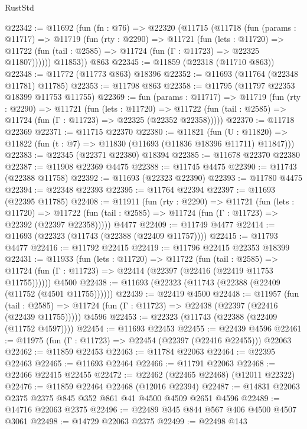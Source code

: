 \begin{lexlean}{RustStd}
\begin{coremodule}
@22342 := @11692
    (fun (fn : @76) =>
    @22320
      (@11715
        (@11718
          (fun (params : @11717) =>
          @11719
            (fun (rty : @2290) =>
            @11721
              (fun (lets : @11720) =>
              @11722 (fun (tail : @2585) => @11724 (fun (Γ : @11723) => @22325 @11807))))))
        @11853))
    @863
@22345 := @11859 (@22318 (@11710 @863))
@22348 := @11772 (@11773 @863) @18396
@22352 := @11693 (@11764 (@22348 @11781) @11785)
@22353 := @11798 @863
@22358 := @11795 (@11797 @22353 @18399 @11753 @11755)
@22369 := fun (params : @11717) =>
  @11719
    (fun (rty : @2290) =>
    @11721
      (fun (lets : @11720) =>
      @11722 (fun (tail : @2585) => @11724 (fun (Γ : @11723) => @22325 (@22352 @22358)))))
@22370 := @11718 @22369
@22371 := @11715 @22370
@22380 := @11821
    (fun (U : @11820) => @11822 (fun (t : @7) => @11830 (@11693 (@11836 @18396 @11711) @11847)))
@22383 := @22345 (@22371 @22380) @18394
@22385 := @11678 @22370 @22380
@22387 := @11908 @22369 @4475
@22388 := @11745 @4475
@22390 := @11743 (@22388 @11758)
@22392 := @11693 (@22323 @22390)
@22393 := @11780 @4475
@22394 := @22348 @22393
@22395 := @11764 @22394
@22397 := @11693 (@22395 @11785)
@22408 := @11911
    (fun (rty : @2290) =>
    @11721
      (fun (lets : @11720) =>
      @11722 (fun (tail : @2585) => @11724 (fun (Γ : @11723) => @22392 (@22397 @22358)))))
    @4477
@22409 := @11749 @4477
@22414 := @11693 (@22323 (@11743 (@22388 (@22409 @11757))))
@22415 := @11793 @4477
@22416 := @11792 @22415
@22419 := @11796 @22415 @22353 @18399
@22431 := @11933
    (fun (lets : @11720) =>
    @11722
      (fun (tail : @2585) =>
      @11724 (fun (Γ : @11723) => @22414 (@22397 (@22416 (@22419 @11753 @11755))))))
    @4500
@22438 := @11693 (@22323 (@11743 (@22388 (@22409 (@11752 (@4501 @11755))))))
@22439 := @22419 @4500
@22448 := @11957
    (fun (tail : @2585) => @11724 (fun (Γ : @11723) => @22438 (@22397 (@22416 (@22439 @11755)))))
    @4596
@22453 := @22323 (@11743 (@22388 (@22409 (@11752 @4597))))
@22454 := @11693 @22453
@22455 := @22439 @4596
@22461 := @11975 (fun (Γ : @11723) => @22454 (@22397 (@22416 @22455))) @22063
@22462 := @11859 @22453
@22463 := @11784 @22063
@22464 := @22395 @22463
@22465 := @11693 @22464
@22466 := @11791 @22063
@22468 := @22466 @22415 @22455
@22472 := @22462 (@22465 @22468) (@12011 @22322)
@22476 := @11859 @22464 @22468 (@12016 @22394)
@22487 := @14831 @22063 @2375 @2375 @845 @352 @861 @41 @4500 @4509 @2651 @4596
@22489 := @14716 @22063 @2375
@22496 := @22489 @345 @844 @567 @406 @4500 @4507 @3061
@22498 := @14729 @22063 @2375
@22499 := @22498 @143

\end{coremodule}
\end{lexlean}
